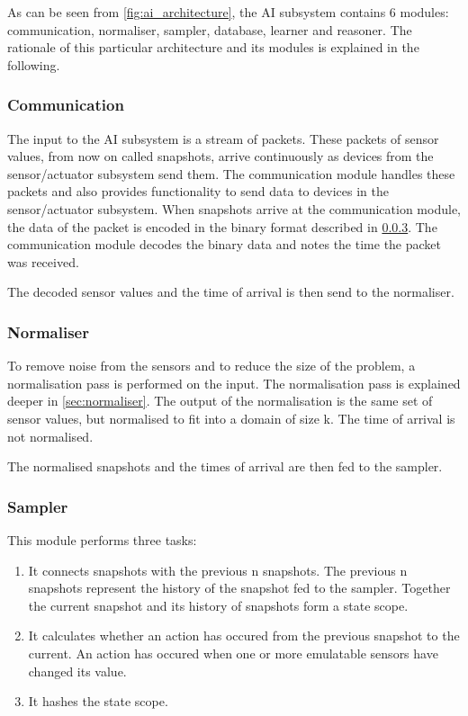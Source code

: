 As can be seen from \cref{fig:ai_architecture}, the AI subsystem contains 6 modules: communication, normaliser, sampler, database, learner and reasoner. The rationale of this particular architecture and its modules is explained in the following.

\subsubsection{Communication}
The input to the AI subsystem is a stream of packets. These packets of sensor values, from now on called snapshots, arrive continuously as devices from the sensor/actuator subsystem send them. The communication module handles these packets and also provides functionality to send data to devices in the sensor/actuator subsystem. When snapshots arrive at the communication module, the data of the packet is encoded in the binary format described in \cref{}. The communication module decodes the binary data and notes the time the packet was received.

The decoded sensor values and the time of arrival is then send to the normaliser.

\subsubsection{Normaliser}
To remove noise from the sensors and to reduce the size of the problem, a normalisation pass is performed on the input. The normalisation pass is explained deeper in \cref{sec:normaliser}. The output of the normalisation is the same set of sensor values, but normalised to fit into a domain of size k. The time of arrival is not normalised.

The normalised snapshots and the times of arrival are then fed to the sampler.

\subsubsection{Sampler}
This module performs three tasks:

\begin{enumerate}
\item It connects snapshots with the previous n snapshots. The previous n snapshots represent the history of the snapshot fed to the sampler. Together the current snapshot and its history of snapshots form a state scope.
\item It calculates whether an action has occured from the previous snapshot to the current. An action has occured when one or more emulatable sensors have changed its value.
\item It hashes the state scope.
\end{enumerate}

